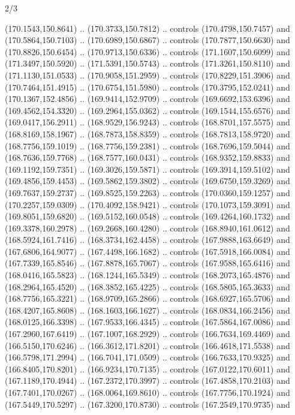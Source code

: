 \begin{flagdescription}{2/3}
\begin{scope}[shift={(0.5\flaglength,0.5)},scale=\flagwidth/320]
\begin{scope}[y=0.8pt, x=0.8pt, yscale=-1,shift={(-118.3,-146)}]
  (170.1543,150.8641) .. (170.3733,150.7812) .. controls (170.4798,150.7457) and
  (170.5864,150.7103) .. (170.6989,150.6867) .. controls (170.7877,150.6630) and
  (170.8826,150.6454) .. (170.9713,150.6336) .. controls (171.1607,150.6099) and
  (171.3497,150.5920) .. (171.5391,150.5743) .. controls (171.3261,150.8110) and
  (171.1130,151.0533) .. (170.9058,151.2959) .. controls (170.8229,151.3906) and
  (170.7464,151.4915) .. (170.6754,151.5980) .. controls (170.3795,152.0241) and
  (170.1367,152.4856) .. (169.9414,152.9709) .. controls (169.6692,153.6396) and
  (169.4562,154.3320) .. (169.2964,155.0362) .. controls (169.1544,155.6576) and
  (169.0417,156.2911) .. (168.9529,156.9243) .. controls (168.8701,157.5575) and
  (168.8169,158.1967) .. (168.7873,158.8359) .. controls (168.7813,158.9720) and
  (168.7756,159.1019) .. (168.7756,159.2381) .. controls (168.7696,159.5044) and
  (168.7636,159.7768) .. (168.7577,160.0431) .. controls (168.9352,159.8833) and
  (169.1192,159.7351) .. (169.3026,159.5871) .. controls (169.3914,159.5102) and
  (169.4856,159.4453) .. (169.5862,159.3802) .. controls (169.6750,159.3269) and
  (169.7637,159.2737) .. (169.8525,159.2263) .. controls (170.0360,159.1257) and
  (170.2257,159.0309) .. (170.4092,158.9421) .. controls (170.1073,159.3091) and
  (169.8051,159.6820) .. (169.5152,160.0548) .. controls (169.4264,160.1732) and
  (169.3378,160.2978) .. (169.2668,160.4280) .. controls (168.8940,161.0612) and
  (168.5924,161.7416) .. (168.3734,162.4458) .. controls (167.9888,163.6649) and
  (167.6806,164.9077) .. (167.4498,166.1682) .. controls (167.5918,166.0084) and
  (167.7339,165.8546) .. (167.8878,165.7067) .. controls (167.9588,165.6416) and
  (168.0416,165.5823) .. (168.1244,165.5349) .. controls (168.2073,165.4876) and
  (168.2964,165.4520) .. (168.3852,165.4225) .. controls (168.5805,165.3633) and
  (168.7756,165.3221) .. (168.9709,165.2866) .. controls (168.6927,165.5706) and
  (168.4207,165.8608) .. (168.1603,166.1627) .. controls (168.0834,166.2456) and
  (168.0125,166.3398) .. (167.9533,166.4345) .. controls (167.5864,167.0086) and
  (167.2960,167.6419) .. (167.1007,168.2929) .. controls (166.7634,169.4469) and
  (166.5150,170.6246) .. (166.3612,171.8201) .. controls (166.4618,171.5538) and
  (166.5798,171.2994) .. (166.7041,171.0509) .. controls (166.7633,170.9325) and
  (166.8405,170.8201) .. (166.9234,170.7135) .. controls (167.0122,170.6011) and
  (167.1189,170.4944) .. (167.2372,170.3997) .. controls (167.4858,170.2103) and
  (167.7401,170.0267) .. (168.0064,169.8610) .. controls (167.7756,170.1924) and
  (167.5449,170.5297) .. (167.3200,170.8730) .. controls (167.2549,170.9735) and

\end{scope}
\end{scope}
\end{flagdescription}
